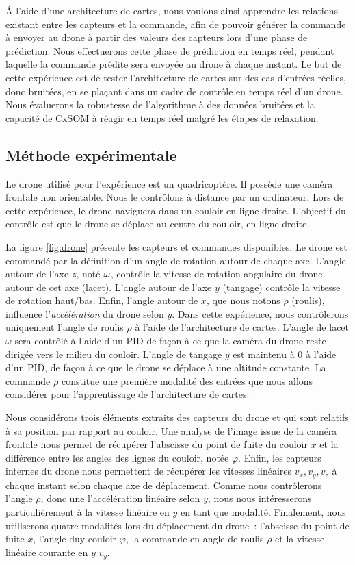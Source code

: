 \documentclass[../main]{subfiles}
\begin{document}
\'A l'aide d'une architecture de cartes, nous voulons ainsi apprendre les relations existant entre les capteurs et la commande, afin de pouvoir générer la commande à envoyer au drone à partir des valeurs des capteurs lors d'une phase de prédiction.
Nous effectuerons cette phase de prédiction en temps réel, pendant laquelle la commande prédite sera envoyée au drone à chaque instant.
Le but de cette expérience est de tester l'architecture de cartes sur des cas d'entrées réelles, donc bruitées, en se plaçant dans un cadre de contrôle en temps réel d'un drone.
Nous évaluerons la robustesse de l'algorithme à des données bruitées et la capacité de CxSOM à réagir en temps réel malgré les étapes de relaxation.

\subsection{Méthode expérimentale}

Le drone utilisé pour l'expérience est un quadricoptère. Il possède une caméra frontale non orientable.
Nous le contrôlons à distance par un ordinateur.  Lors de cette expérience, le drone naviguera dans un couloir en ligne droite. L'objectif du contrôle est que le drone se déplace au centre du couloir, en ligne droite.


La figure \ref{fig:drone} présente les capteurs et commandes disponibles.
Le drone est commandé par la définition d'un angle de rotation autour de chaque axe. 
L'angle autour de l'axe $z$, noté $\omega$, contrôle la vitesse de rotation angulaire du drone autour de cet axe (lacet).
L'angle autour de l'axe $y$ (tangage) contrôle la vitesse de rotation haut/bas. Enfin, l'angle autour de $x$, que nous notons $\rho$ (roulis), influence l'\emph{accélération} du drone selon $y$. Dans cette expérience, nous contrôlerons uniquement l'angle de roulis $\rho$ à l'aide de l'architecture de cartes.
L'angle de lacet $\omega$ sera contrôlé à l'aide d'un PID de façon à ce que la caméra du drone reste dirigée vers le milieu du couloir. L'angle de tangage $y$ est maintenu à 0 à l'aide d'un PID, de façon à ce que le drone se déplace à une altitude constante.
La commande $\rho$ constitue une première modalité des entrées que nous allons considérer pour l'apprentissage de l'architecture de cartes.

Nous considérons trois éléments extraits des capteurs du drone et qui sont relatifs à sa position par rapport au couloir. Une analyse de l'image issue de la caméra frontale nous permet de récupérer l'abscisse du point de fuite du couloir $x$ et la différence entre les angles des lignes du couloir, notée $\varphi$.
Enfin, les capteurs internes du drone nous permettent de récupérer les vitesses linéaires $v_x,v_y,v_z$ à chaque instant selon chaque axe de déplacement. 
Comme nous contrôlerons l'angle $\rho$, donc une l'accélération linéaire selon $y$, nous nous intéresserons particulièrement à la vitesse linéaire en $y$ en tant que modalité.
Finalement, nous utiliserons quatre modalités lors du déplacement du drone~: l'abscisse du point de fuite $x$, l'angle duy couloir $\varphi$, la commande en angle de roulis $\rho$ et la vitesse linéaire courante en $y$ $v_y$.
\end{document}
